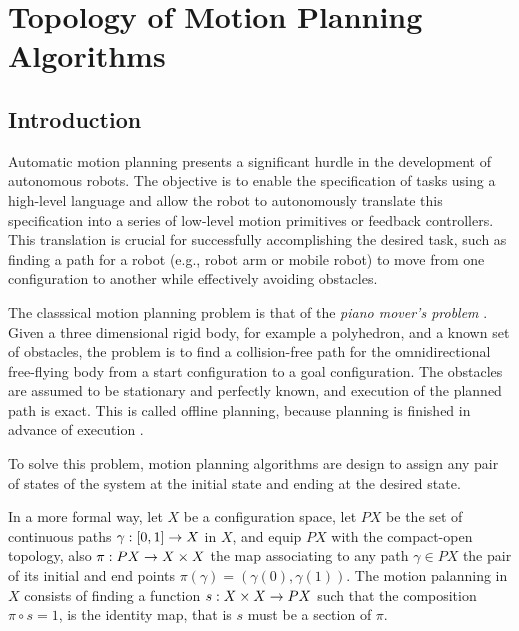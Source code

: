\chapter{Topology of Motion Planning Algorithms}

\section{Introduction}

Automatic motion planning presents a significant hurdle in the development of autonomous robots. The objective is to enable the specification of tasks using a high-level language and allow the robot to autonomously translate this specification into a series of low-level motion primitives or feedback controllers. This translation is crucial for successfully accomplishing the desired task, such as finding a path for a robot (e.g., robot arm or mobile robot) to move from one configuration to another while effectively avoiding obstacles.

The classsical motion planning problem is that of the \textit{piano mover's problem} \cite{schwartz:1983a}. Given a three dimensional rigid body, for example a polyhedron, and a known set of obstacles, the problem is to find a collision-free path for the omnidirectional free-flying body from a start configuration to a goal configuration. The obstacles are assumed to be stationary and perfectly known, and execution of the planned path is exact. This is called offline planning, because planning is finished in advance of execution \cite{choset2005principles}.


To solve this problem, motion planning algorithms are design to assign any pair of states of the system at the initial state and ending at the desired state.

In a more formal way, let $X$ be a configuration space, let $PX$ be the set of continuous paths $\displaystyle \gamma : [0,1] \rightarrow X$ in $X$, and equip $PX$ with the compact-open topology, also $\pi : PX \rightarrow X \times X$ the map associating to any path $\gamma \in PX$ the pair of its initial and end points $\pi(\gamma) = (\gamma(0), \gamma(1))$. The motion palanning in $X$ consists of finding a function $s : X \times X \rightarrow PX$ such that the composition $\pi \circ s = 1$, is the identity map, that is $s$ must be a section of $\pi$.


